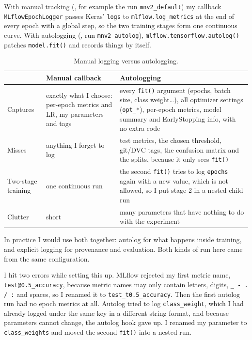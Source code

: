 With manual tracking (, for example the run \texttt{mnv2\_default}) my
callback \texttt{MLflowEpochLogger} passes Keras' \texttt{logs} to \texttt{mlflow.log\_metrics}
at the end of every epoch with a global step, so the two training stages form one continuous curve.
With autologging (, run \texttt{mnv2\_autolog}),
\texttt{mlflow.tensorflow.autolog()} patches \texttt{model.fit()} and records things by itself.

\begin{table}[H]\centering\small
\begin{tabularx}{\linewidth}{l X X}
\toprule
 & Manual callback & Autologging \\
\midrule
Captures & exactly what I choose: per-epoch metrics and LR, my parameters and tags & every \texttt{fit()} argument (epochs, batch size, class weight\ldots), all optimizer settings (\texttt{opt\_*}), per-epoch metrics, model summary and EarlyStopping info, with no extra code \\
Misses & anything I forget to log & test metrics, the chosen threshold, git/DVC tags, the confusion matrix and the splits, because it only sees \texttt{fit()} \\
Two-stage training & one continuous run & the second \texttt{fit()} tries to log \texttt{epochs} again with a new value, which is not allowed, so I put stage 2 in a nested child run \\
Clutter & short & many parameters that have nothing to do with the experiment \\
\bottomrule
\end{tabularx}
\caption{Manual logging versus autologging.}\end{table}

In practice I would use both together: autolog for what happens inside training, and explicit
logging for provenance and evaluation. Both kinds of run here came from the same configuration.


I hit two errors while setting this up. MLflow rejected my first metric name,
\texttt{test@0.5\_accuracy}, because metric names may only contain letters, digits, \texttt{\_ - .
/ :} and spaces, so I renamed it to \texttt{test\_t0.5\_accuracy}. Then the first autolog run had
no epoch metrics at all. Autolog tried to log \texttt{class\_weight}, which I had already logged
under the same key in a different string format, and because parameters cannot change, the autolog
hook gave up. I renamed my parameter to \texttt{class\_weights} and moved the second \texttt{fit()}
into a nested run.

